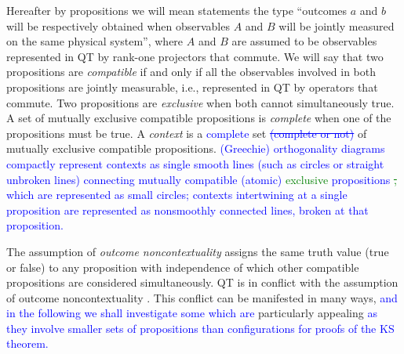 \documentclass[%
  twocolumn,
 showpacs,
 showkeys,
 preprintnumbers,
 amsmath,amssymb,
 aps,
  pra,
  longbibliography,
 floatfix,
 ]{revtex4-1}
\newcommand{\karl}[1]{\textcolor{blue}{#1}}
\newcommand{\karllate}[1]{\textcolor{green}{#1}}
\begin{document}
Hereafter by propositions we will mean statements the type ``outcomes $a$ and $b$ will be respectively obtained
when observables $A$ and $B$ will be jointly measured on the same physical system'',
where $A$ and $B$ are assumed to be observables represented in QT by rank-one projectors that commute.
We will say that two propositions are {\em compatible} if and only if all the observables involved in both propositions
are jointly measurable, i.e., represented in QT by operators that commute.
Two propositions are {\em exclusive} when both cannot simultaneously true.
 A set of mutually exclusive compatible propositions is {\em complete} when one of the propositions must be true.
A {\em context} is a \karl{complete} set \karl{\sout{(complete or not)}} of mutually exclusive compatible propositions.
\karl{(Greechie) orthogonality diagrams~\cite{greechie:71} compactly represent contexts as single smooth lines
(such as circles or straight unbroken lines) connecting mutually compatible (atomic) \karllate{exclusive} propositions \karllate{\sout{,}}
which are represented as small circles;
contexts intertwining at a single proposition are represented as nonsmoothly connected lines, broken at that proposition.}

The assumption of {\em outcome noncontextuality} assigns the same truth value (true or false) to any proposition
with independence of which other compatible propositions are considered simultaneously.
QT is in conflict with the assumption of outcome noncontextuality \cite{code1, code2, code3, code4}.
This conflict can be manifested in many ways,
\karl{and in the following we shall investigate some which are} particularly appealing \karl{as they involve
smaller sets of propositions than configurations for proofs of the KS theorem.}
\end{document}
